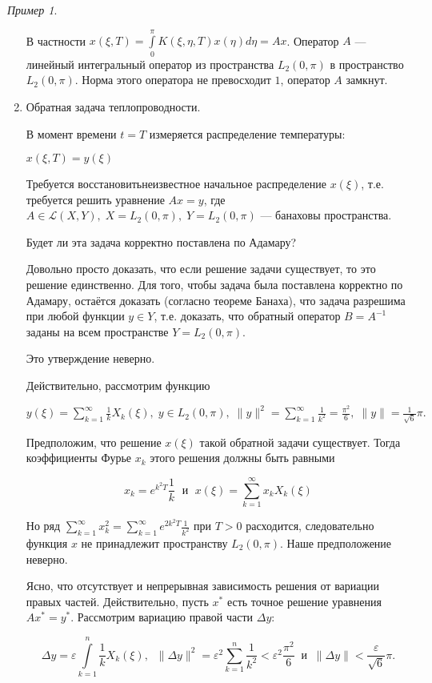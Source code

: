 \documentclass[12pt,a4paper,titlepage,oneside]{book}
\theoremstyle{definition}
\theoremstyle{plain}
\theoremstyle{break}
\theoremstyle{remark}
\theoremstyle{remark}
\newtheorem*{example}{Пример}
\theoremstyle{remark}
\theoremstyle{remark}
\theoremstyle{plain}
\theoremstyle{plain}
\begin{document}
\begin{example}
\begin{enumerate}
В частности $x(\xi,T) = \displaystyle\int\limits_0^\pi K(\xi, \eta, T) x(\eta)d\eta = Ax$. Оператор $A$ --- линейный интегральный оператор из пространства $L_2(0, \pi)$ в пространство $L_2(0, \pi)$. Норма этого оператора не превосходит $1$, оператор $A$ замкнут.

	\item Обратная задача теплопроводности.

В момент времени $t = T$ измеряется  распределение температуры:
\begin{center}
$x(\xi, T) = y(\xi)$
\end{center}

Требуется \guillemotleft восстановить\guillemotright \;неизвестное начальное распределение $x(\xi)$, т.е. требуется решить уравнение $Ax = y$, где $A \in \mathcal{L}(X,Y), \; X = L_{2}(0, \pi), \; Y = L_{2}(0, \pi)$ --- банаховы пространства.

Будет ли эта задача корректно поставлена по Адамару?

Довольно просто доказать, что если решение задачи существует, то это решение единственно. Для того, чтобы задача была поставлена корректно по Адамару, остаётся доказать (согласно теореме Банаха), что задача разрешима при любой функции $y \in Y$, т.е. доказать, что обратный оператор $B = A^{-1}$ заданы на всем пространстве $Y = L_{2}(0, \pi)$.

Это утверждение неверно.

Действительно, рассмотрим функцию
\begin{center}
$y(\xi)=\displaystyle\sum\limits_{k=1}^{\infty} \frac{1}{k} X_k(\xi) ,  \; y\in L_{2}(0, \pi), \; \|y\|^2 = \sum\limits_{k=1}^{\infty} \frac{1}{k^2} = \frac{\pi^2}{6} ,  \; \|y\| = \frac{1}{\sqrt{6}}\pi \mbox{.}$
\end{center}

Предположим, что решение $x(\xi)$ такой обратной задачи существует. Тогда коэффициенты Фурье $x_k$ этого решения должны быть равными

$$x_k=e^{k^2 T} \frac{1}{k} \; \mbox{ и } \; x(\xi) = \displaystyle\sum\limits_{k=1}^{\infty} x_k X_k(\xi)$$

Но ряд $\displaystyle\sum\limits_{k=1}^{\infty} x_k^2 = \sum\limits_{k=1}^{\infty} e^{2k^2 T} \frac{1}{k^2}$ при $T > 0$ расходится, следовательно функция $x$ не принадлежит пространству $L_2(0,\pi)$. Наше предположение неверно.

Ясно, что отсутствует и непрерывная зависимость решения от вариации правых частей. Действительно, пусть $x^{*}$ есть точное решение уравнения $Ax^*=y^*$. Рассмотрим вариацию правой части  $\Delta y$:
\begin{center}
$$\Delta y = \varepsilon \int\limits_{k=1}^{n} \frac{1}{k} X_k(\xi) , \; \; \| \Delta y\|^2 = \varepsilon ^2 \sum\limits_{k=1}^{n} \frac{1}{k^2} < \varepsilon^2 \frac{\pi ^2}{6} \; \; \mbox{и} \; \; \| \Delta y \| < \frac{\varepsilon}{\sqrt{6}}\pi.$$
\end{center}


\end{enumerate}
\end{example}
\end{document}

